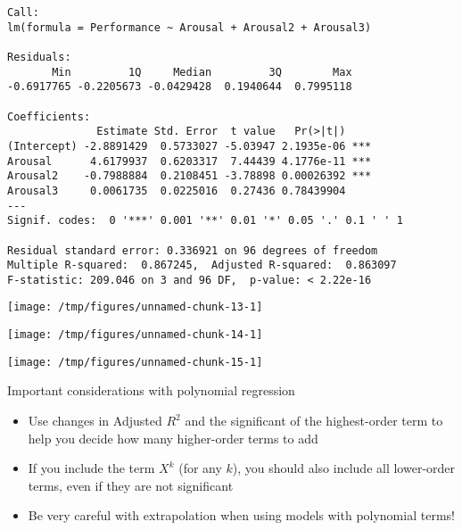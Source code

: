 \documentclass{beamer}\usepackage[]{graphicx}\usepackage[]{color}
\makeatletter
\def\maxwidth{ %
  \ifdim\Gin@nat@width>\linewidth
    \linewidth
  \else
    \Gin@nat@width
  \fi
}
\newenvironment{kframe}{%
 \def\at@end@of@kframe{}%
 \ifinner\ifhmode%
  \def\at@end@of@kframe{\end{minipage}}%
  \begin{minipage}{\columnwidth}%
 \fi\fi%
 \def\FrameCommand##1{\hskip\@totalleftmargin \hskip-\fboxsep
 \colorbox{shadecolor}{##1}\hskip-\fboxsep
     \hskip-\linewidth \hskip-\@totalleftmargin \hskip\columnwidth}%
 \MakeFramed {\advance\hsize-\width
   \@totalleftmargin\z@ \linewidth\hsize
   \@setminipage}}%
 {\par\unskip\endMakeFramed%
 \at@end@of@kframe}
\newenvironment{knitrout}{}{} %
\makeatother
\begin{document}
\begin{darkframes}
\begin{frame}[fragile]
\begin{knitrout}
\begin{kframe}
\begin{verbatim}
Call:
lm(formula = Performance ~ Arousal + Arousal2 + Arousal3)

Residuals:
       Min         1Q     Median         3Q        Max 
-0.6917765 -0.2205673 -0.0429428  0.1940644  0.7995118 

Coefficients:
              Estimate Std. Error  t value   Pr(>|t|)    
(Intercept) -2.8891429  0.5733027 -5.03947 2.1935e-06 ***
Arousal      4.6179937  0.6203317  7.44439 4.1776e-11 ***
Arousal2    -0.7988884  0.2108451 -3.78898 0.00026392 ***
Arousal3     0.0061735  0.0225016  0.27436 0.78439904    
---
Signif. codes:  0 '***' 0.001 '**' 0.01 '*' 0.05 '.' 0.1 ' ' 1

Residual standard error: 0.336921 on 96 degrees of freedom
Multiple R-squared:  0.867245,	Adjusted R-squared:  0.863097 
F-statistic: 209.046 on 3 and 96 DF,  p-value: < 2.22e-16
\end{verbatim}
\end{kframe}
\end{knitrout}
    \end{frame}

    \begin{frame}
\begin{knitrout}
\color{fgcolor}
\texttt{[image: /tmp/figures/unnamed-chunk-13-1]} 

\end{knitrout}
    \end{frame}

    \begin{frame}
\begin{knitrout}
\color{fgcolor}
\texttt{[image: /tmp/figures/unnamed-chunk-14-1]} 

\end{knitrout}
    \end{frame}

    \begin{frame}
\begin{knitrout}
\color{fgcolor}
\texttt{[image: /tmp/figures/unnamed-chunk-15-1]} 

\end{knitrout}
    \end{frame}

    \begin{frame}{Important considerations with polynomial regression}
      \begin{itemize}[<+->]
        \item Use changes in Adjusted $R^2$ and the significant of the highest-order term to help you decide how many higher-order terms to add
        \item If you include the term $X^k$ (for any $k$), you should also include all lower-order terms, even if they are not significant
        \item Be very careful with extrapolation when using models with polynomial terms!
      \end{itemize}
    \end{frame}


\end{darkframes}
\end{document}
